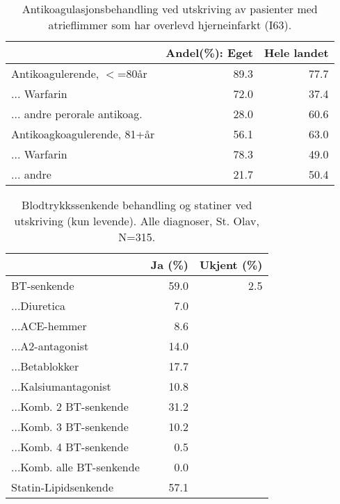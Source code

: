\documentclass [norsk,a4paper,twoside]{article}\usepackage[]{graphicx}\usepackage[]{color}
\begin{document}
\begin{table}[ht]
\centering
\begin{tabular}{lrr}
  \hline
 & Andel(\%):  Eget & Hele landet \\ 
  \hline
Antikoagulerende, $<$=80år & 89.3 & 77.7 \\ 
  ... Warfarin & 72.0 & 37.4 \\ 
  ... andre perorale antikoag. & 28.0 & 60.6 \\ 
  Antikoagkoagulerende,  81+år & 56.1 & 63.0 \\ 
  ... Warfarin  & 78.3 & 49.0 \\ 
  ... andre  & 21.7 & 50.4 \\ 
   \hline
\end{tabular}
\caption{Antikoagulasjonsbehandling ved utskriving av pasienter med atrieflimmer som har  
			overlevd hjerneinfarkt (I63).} 
\label{tab:MedBehDivUt}
\end{table}
\begin{table}[ht]
\centering
\begin{tabular}{lrr}
  \hline
 & Ja (\%) & Ukjent (\%) \\ 
  \hline
BT-senkende & 59.0 & 2.5 \\ 
  ...Diuretica & 7.0 &  \\ 
  ...ACE-hemmer & 8.6 &  \\ 
  ...A2-antagonist & 14.0 &  \\ 
  ...Betablokker & 17.7 &  \\ 
  ...Kalsiumantagonist & 10.8 &  \\ 
  ...Komb. 2 BT-senkende & 31.2 &  \\ 
  ...Komb. 3 BT-senkende & 10.2 &  \\ 
  ...Komb. 4 BT-senkende & 0.5 &  \\ 
  ...Komb. alle BT-senkende & 0.0 &  \\ 
  Statin-Lipidsenkende & 57.1 &  \\ 
   \hline
\end{tabular}
\caption{Blodtrykkssenkende behandling og statiner ved utskriving (kun levende). 
		Alle diagnoser, St. Olav, N=315.} 
\label{tab:MedBehBTSUt1}
\end{table}
\end{document}

